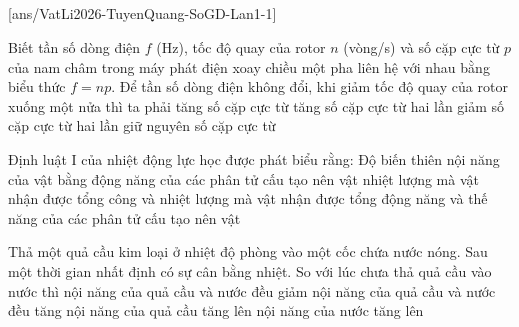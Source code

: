 \def\CheDo{solcolor}%
\def\tenchuong{Sở GD\&ĐT Tuyên Quang -- Lần 1}
\def\thuonghieu{VẬT LÍ 12 -- Eduzy.com.vn}
\def\TachCauDS{1}
\def\TachCauLG{1}




	\noindent
	\subsection*{}
	\setcounter{ex}{0}
	[ans/VatLi2026-TuyenQuang-SoGD-Lan1-1]

	\begin{ex}%
		Biết tần số dòng điện $f$ (Hz), tốc độ quay của rotor $n$ (vòng/s) và số cặp cực từ $p$ của nam châm trong máy phát điện xoay chiều một pha liên hệ với nhau bằng biểu thức $f=np$. Để tần số dòng điện không đổi, khi giảm tốc độ quay của rotor xuống một nửa thì ta phải
		\choice
		{tăng số cặp cực từ}
		{\True tăng số cặp cực từ hai lần}
		{giảm số cặp cực từ hai lần}
		{giữ nguyên số cặp cực từ}
	\end{ex}

	\begin{ex}%
		Định luật I của nhiệt động lực học được phát biểu rằng: Độ biến thiên nội năng của vật bằng
		\choice
		{động năng của các phân tử cấu tạo nên vật}
		{nhiệt lượng mà vật nhận được}
		{\True tổng công và nhiệt lượng mà vật nhận được}
		{tổng động năng và thế năng của các phân tử cấu tạo nên vật}
	\end{ex}

	\begin{ex}%
		Thả một quả cầu kim loại ở nhiệt độ phòng vào một cốc chứa nước nóng. Sau một thời gian nhất định có sự cân bằng nhiệt. So với lúc chưa thả quả cầu vào nước thì
		\choice
		{nội năng của quả cầu và nước đều giảm}
		{nội năng của quả cầu và nước đều tăng}
		{\True nội năng của quả cầu tăng lên}
		{nội năng của nước tăng lên}
	\end{ex}

